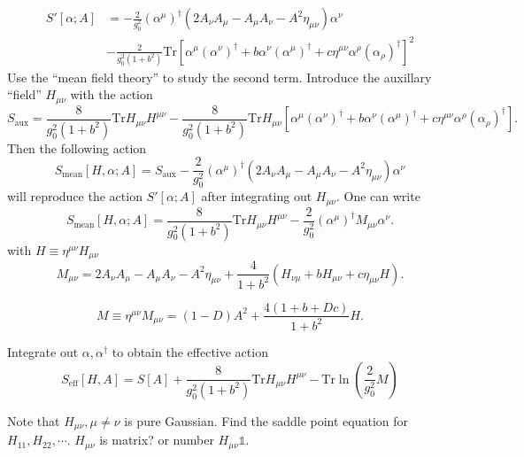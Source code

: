 \begin{align*}
	S'[\alpha;A] &= - \frac{2}{g_0^2} (\alpha^\mu)^\dagger
	(2 A_\nu A_\mu - A_\mu A_\nu - A^2 \eta_{\mu\nu}) \alpha^\nu \\
				 &- \frac{2}{g_0^2(1+b^2)} \mathrm{Tr} \left[ \alpha^\mu (\alpha^\nu)^\dagger
+ b \alpha^\nu (\alpha^\mu)^\dagger + c \eta^{\mu\nu} \alpha^\rho (\alpha_\rho)^\dagger\right] ^2
\end{align*}
Use the ``mean field theory'' to study the second term.
Introduce the auxillary ``field'' $H_{\mu\nu}$
with the action
\[
	S_{\text{aux}} =  \frac{8}{g_0^2(1 + b^2)} \mathrm{Tr} H_{\mu\nu} H^{\mu\nu}
	- \frac{8}{g_0^2(1+b^2)} \mathrm{Tr} H_{\mu\nu}
	\left[ \alpha^\mu (\alpha^\nu)^\dagger + b \alpha^\nu (\alpha^\mu)^\dagger
	+ c \eta^{\mu\nu} \alpha^\rho (\alpha_\rho)^\dagger\right] 
.\] 
Then the following action
\[
	S_{\text{mean}}[H,\alpha;A] = S_{\text{aux}} - \frac{2}{g_0^2} (\alpha^\mu)^\dagger
	(2 A_\nu A_\mu - A_\mu A_\nu - A^2 \eta_{\mu\nu}) \alpha^\nu
\] 
will reproduce the action $S'[\alpha;A]$ after integrating out $H_{\mu\nu}$.
One can write
\[
	S_{\text{mean}}[H,\alpha;A] = \frac{8}{g_0^2 (1+b^2)}
	\mathrm{Tr}H_{\mu\nu}H^{\mu\nu} - \frac{2}{g_0^2}
	(\alpha^\mu)^\dagger M_{\mu\nu} \alpha^\nu
.\] 
with $H\equiv\eta^{\mu\nu}H_{\mu\nu}$
\[
	M_{\mu\nu} = 2A_\nu A_\mu - A_\mu A_\nu - A^2 \eta_{\mu\nu}
	+ \frac{4}{1+b^2} \left( H_{\nu\mu} + b H_{\mu\nu}
	+ c \eta_{\mu\nu}H\right) 
.\] 

\[
	M\equiv\eta^{\mu\nu} M_{\mu\nu} = (1-D)A^2 + \frac{4(1+b+Dc)}{1+b^2}H
.\] 

Integrate out $\alpha,\alpha^\dagger$ to obtain the effective action
\begin{equation*}
	S_{\text{eff}}[H,A] = S[A] + \frac{8}{g_0^2 (1+b^2)} \mathrm{Tr}H_{\mu\nu}H^{\mu\nu}
	- \mathrm{Tr} \ln \left( \frac{2}{g_0^2} M \right) 
\end{equation*}

Note that $H_{\mu\nu},\mu\neq\nu$ is pure Gaussian.
Find the saddle point equation for $H_{11},H_{22},\cdots$.
$H_{\mu\nu}$ is matrix? or number $H_{\mu\nu}\mathds{1}$.
